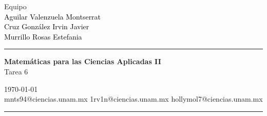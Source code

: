 \documentclass[a4paper,10pt]{article}
\begin{document}
\fancyhead[C]{}
\begin{minipage}{0.295\textwidth} 
\raggedright
Equipo\\    
\footnotesize 
\colorbox[rgb]{0.96, 0.73, 1.0}{\textcolor{black}{Aguilar Valenzuela Montserrat}}
\\\colorbox[rgb]{0.98, 0.93, 0.36}{\textcolor{black}{Cruz González Irvin Javier}}
\\\colorbox[rgb]{0.94, 1.0, 0.94}{\textcolor{black}{Murrillo Rosas Estefania}}
\textcolor[rgb]{0.74, 0.83, 0.9}{\medskip\hrule}
\end{minipage}
\begin{minipage}{0.4\textwidth} 
\centering 
\large 
\textbf{Matemáticas para las Ciencias Aplicadas II}\\ 
\normalsize 
Tarea 6\\
\end{minipage}
\begin{minipage}{0.295\textwidth} 
\raggedleft
\today\\ 
\footnotesize
mnts94@ciencias.unam.mx
1rv1n@ciencias.unam.mx
hollymol7@ciencias.unam.mx 
\textcolor[rgb]{0.74, 0.83, 0.9}{\medskip\hrule}
\end{minipage}
\end{document}
